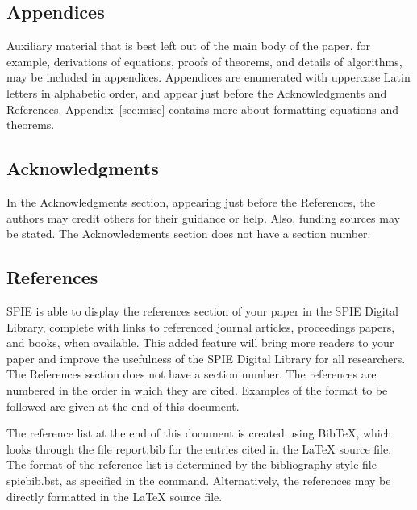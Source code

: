 \subsection{Appendices}
Auxiliary material that is best left out of the main body of the paper, for example, derivations of equations, proofs of theorems, and details of algorithms, may be included in appendices.  Appendices are enumerated with uppercase Latin letters in alphabetic order, and appear just before the Acknowledgments and References. Appendix~\ref{sec:misc} contains more about formatting equations and theorems.

\subsection{Acknowledgments}
In the Acknowledgments section, appearing just before the References, the authors may credit others for their guidance or help.  Also, funding sources may be stated.  The Acknowledgments section does not have a section number.

\subsection{References}
SPIE is able to display the references section of your paper in the SPIE Digital Library, complete with links to referenced journal articles, proceedings papers, and books, when available. This added feature will bring more readers to your paper and improve the usefulness of the SPIE Digital Library for all researchers. The References section does not have a section number.  The references are numbered in the order in which they are cited.  Examples of the format to be followed are given at the end of this document.

The reference list at the end of this document is created using BibTeX, which looks through the file {\ttfamily report.bib} for the entries cited in the LaTeX source file.  The format of the reference list is determined by the bibliography style file {\ttfamily spiebib.bst}, as specified in the \verb|| command.  Alternatively, the references may be directly formatted in the LaTeX source file.

